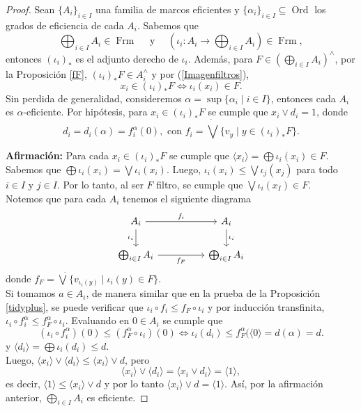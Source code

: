 \documentclass[11pt]{amsart}
\DeclareMathOperator{\Ord}{Ord}
\DeclareMathOperator{\Frm}{Frm}
\theoremstyle{plain}
\theoremstyle{definition}
\begin{document}
\begin{proof}
Sean $\{A_i\}_{i\in I}$ una familia de marcos eficientes y $\{\alpha_i\}_{i\in I}\subseteq \Ord$ los grados de eficiencia de cada $A_i$. Sabemos que 
\[
\bigoplus_{i\in I} A_i\in \Frm \quad \mbox{ y }\quad (\iota_i\colon A_i\to \bigoplus_{i\in I} A_i)\in \Frm,
\]
entonces $(\iota_i)_*$ es el adjunto derecho de $\iota_i$. Además, para $F\in (\bigoplus_{i\in I} A_i)^\wedge$, por la Proposición \ref{fF}, $(\iota_i)_*F\in A_i^\wedge$ y por (\ref{Imagenfiltros}), 
\[
x_i\in (\iota_i)_*F\Leftrightarrow \iota_i(x_i)\in F.
\]
Sin perdida de generalidad, consideremos $\alpha=\sup\{\alpha_i\mid i\in I\}$, entonces cada $A_i$ es $\alpha$-eficiente. Por hipótesis, para $x_i\in (\iota_i)_*F$ se cumple que $x_i\vee d_i=1$, donde
\[
d_i=d_i(\alpha)=f_i^\alpha(0), \mbox{ con } f_i=\dot{\bigvee}\{v_y\mid y\in (\iota_i)_*F\}.
\]

\noindent
\textbf{Afirmación:} Para cada $x_i\in (\iota_i)_*F$ se cumple que $\langle x_i\rangle=\bigoplus \iota_i(x_i)\in F$.\\

Sabemos que $\bigoplus \iota_i(x_i)=\bigvee \iota_i(x_i)$. Luego, $\iota_i(x_i)\leq \bigvee \iota_j(x_j)$ para todo $i\in I$ y $j\in I$. 
Por lo tanto, al ser $F$ filtro, se cumple que $\bigvee \iota_i(x_I)\in F$.\\

Notemos que para cada $A_i$ tenemos el siguiente diagrama
\[\begin{tikzcd}
    {A_i} && {A_i} \\
    {\bigoplus_{i\in I} A_i} && {\bigoplus_{i\in I} A_i}
    \arrow["{f_i}", from=1-1, to=1-3]
    \arrow["{\iota_i}"', from=1-1, to=2-1]
    \arrow["{\iota_i}", from=1-3, to=2-3]
    \arrow["f_F"', from=2-1, to=2-3]
\end{tikzcd}\]
donde $f_F=\dot{\bigvee}\{v_{\iota_i(y)}\mid \iota_i(y)\in F\}$.\\

Si tomamos $a\in A_i$, de manera similar que en la prueba de la Proposición \ref{tidyplus}, se puede verificar que $\iota_i\circ f_i\leq f_F\circ \iota_i$ y por inducción transfinita, $\iota_i\circ f_i^\alpha\leq f_F^\alpha\circ \iota_i$. Evaluando en $0\in A_i$ se cumple que
\[
(\iota_i\circ f_i^\alpha)(0)\leq (f_F^\alpha\circ \iota_i)(0)\Leftrightarrow \iota_i(d_i)\leq f_F^\alpha(\langle 0\rangle=d(\alpha)=d.
\]
y $\langle d_i\rangle =\bigoplus \iota_i(d_i)\leq d$.\\

Luego, $\langle x_i\rangle \vee \langle d_i\rangle\leq \langle x_i\rangle \vee d$, pero 
\[
\langle x_i\rangle \vee \langle d_i\rangle=\langle x_i\vee d_i\rangle = \langle 1\rangle,
\]
es decir, $\langle 1\rangle \leq \langle x_i\rangle \vee d$ y por lo tanto $\langle x_i\rangle \vee d= \langle 1\rangle$. Así, por la afirmación anterior, $ \bigoplus_{i\in I} A_i$ es eficiente.
\end{proof} 
\end{document}

